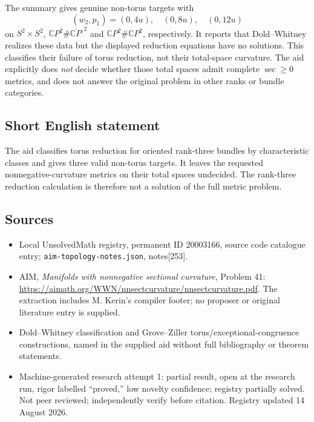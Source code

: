 \documentclass[11pt]{article}
\newcommand{\C}{\mathbb{C}}
\begin{document}
The summary gives genuine non-torus targets with
\[
 (w_2,p_1)=(0,4u),\quad(0,8u),\quad(0,12u)
\]
on $S^2\times S^2$, $\C P^2\#\overline{\C P}^{,2}$ and $\C P^2\#\C P^2$, respectively. It reports that Dold--Whitney realizes these data but the displayed reduction equations have no solutions. This classifies their failure of torus reduction, not their total-space curvature. The aid explicitly does \emph{not} decide whether those total spaces admit complete $\sec\geq0$ metrics, and does not answer the original problem in other ranks or bundle categories.
\subsection{Short English statement}
The aid classifies torus reduction for oriented rank-three bundles by characteristic classes and gives three valid non-torus targets. It leaves the requested nonnegative-curvature metrics on their total spaces undecided. The rank-three reduction calculation is therefore not a solution of the full metric problem.
\subsection{Sources}
\begin{itemize}
\item Local UnsolvedMath registry, permanent ID 20003166, source code catalogue entry; \texttt{aim-topology-notes.json}, notes[253].
\item AIM, \emph{Manifolds with nonnegative sectional curvature}, Problem 41: \url{https://aimath.org/WWN/nnsectcurvature/nnsectcurvature.pdf}. The extraction includes M. Kerin's compiler footer; no proposer or original literature entry is supplied.
\item Dold--Whitney classification and Grove--Ziller torus/exceptional-congruence constructions, named in the supplied aid without full bibliography or theorem statements.
\item Machine-generated research attempt 1: partial result, open at the research run, rigor labelled ``proved,'' low novelty confidence; registry partially solved. Not peer reviewed; independently verify before citation. Registry updated 14 August 2026.
\end{itemize}
\end{document}
